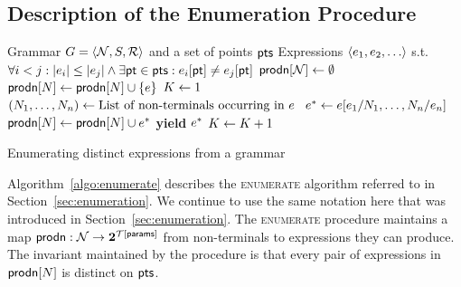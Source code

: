 \begin{appendices}
\section{Description of the Enumeration Procedure}
\label{section:appendix_esolver}
\begin{algorithm}
  \begin{algorithmic}[1]
    \fontsize{8}{10}\selectfont
    \Require Grammar $G = \langle  \mathcal{N}, S, \mathcal{R}  \rangle$ and a set of points $\mathsf{pts}$
    \Ensure Expressions $\langle  e_1, e_2, \ldots  \rangle$ s.t. $\forall i < j : \vert e_i \vert \leq \vert e_j
    \vert \wedge \exists \mathsf{pt} \in \mathsf{pts} : e_i[\mathsf{pt}] \neq e_j[\mathsf{pt}]$
    \ForAll {$\NonTerminal \in \NonTerminals$} $\mathsf{prodn}[\mathcal{N}] \gets \emptyset$ \EndFor
    \ForAll {$(\NonTerminal, \Expr) \in \Rules$}\label{line:enumerate:level_one_iter}
    \If { $\Expr \in \Theory[\FormalParameters]$ }
    $\mathsf{prodn}[N] \gets \mathsf{prodn}[N] \cup \{ e \}$  \label{line:enumerate:level_one}
    \EndIf
    \EndFor
    \State $ K \gets 1 $
    \While { $\True$ }
    \ForAll {$(\NonTerminal, \Expr) \in \Rules$}
    \State $(N_1, \ldots, N_n) \gets \mbox{List of non-terminals occurring in $e$ }$
    \State $e^* \gets e[e_1/N_1,\ldots,N_n/e_n]$
    \State $\mathsf{prodn}[N] \gets \mathsf{prodn}[N] \cup e^*$
    \If { $\NonTerminal = \StartSymbol$ } \textbf{yield} $e^*$ \EndIf
    \EndIf
    \EndFor
    \EndFor
    \State $K \gets K + 1$
    \EndWhile
  \end{algorithmic}
  \caption{Enumerating distinct expressions from a grammar}
  \label{algo:enumerate}
\end{algorithm}

Algorithm~\ref{algo:enumerate} describes the \textsc{enumerate}
algorithm referred to in Section~\ref{sec:enumeration}. We continue to
use the same notation here that was introduced in Section~\ref{sec:enumeration}.
The \textsc{enumerate} procedure maintains a map $\mathsf{prodn} : \mathcal{N} \to
\mathbf{2}^{\mathcal{T}[\mathsf{params}]}$ from non-terminals to
expressions they can produce.
The invariant maintained by the procedure is that every pair of
expressions in $\mathsf{prodn}[N]$ is distinct on $\mathsf{pts}$.


\end{appendices}
